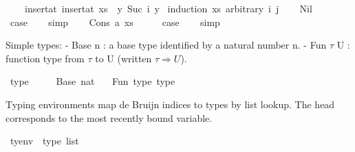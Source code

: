 \begin{isabellebody}
\ \ \ {\isacharequal}{\kern0pt}\ insert{\isacharunderscore}{\kern0pt}at\ {\isacharparenleft}{\kern0pt}insert{\isacharunderscore}{\kern0pt}at\ xs\ {}\ y{}{\isacharparenright}{\kern0pt}\ {\isacharparenleft}{\kern0pt}Suc\ i{\isacharparenright}{\kern0pt}\ y{}{\isachardoublequoteclose}\isanewline
%
\isadelimproof
%
\endisadelimproof
%
\isatagproof
{}\isamarkupfalse%
\ {\isacharparenleft}{\kern0pt}induction\ xs\ arbitrary{\isacharcolon}{\kern0pt}\ i\ j{\isacharparenright}{\kern0pt}\isanewline
\ \ \isamarkupfalse%
\ Nil\isanewline
\ \ \isamarkupfalse%
\ \isamarkupfalse%
\ {\isacharquery}{\kern0pt}case\isanewline
\ \ \isamarkupfalse%
\ simp\isanewline
{}\isamarkupfalse%
\isanewline
\ \ \isamarkupfalse%
\ {\isacharparenleft}{\kern0pt}Cons\ a\ xs{\isacharparenright}{\kern0pt}\isanewline
\ \ \isamarkupfalse%
\ \isamarkupfalse%
\ {\isacharquery}{\kern0pt}case\isanewline
\ \ \isamarkupfalse%
\ simp\isanewline
{}\isamarkupfalse%
%
\endisatagproof
{\isafoldproof}%
%
\isadelimproof
%
\endisadelimproof
%
\isadelimdocument
%
\endisadelimdocument
%
\isatagdocument
%
\isamarkuptrue%
%
\endisatagdocument
{\isafolddocument}%
%
\isadelimdocument
%
\endisadelimdocument
%
\begin{isamarkuptext}%
Simple types:
  - Base n : a base type identified by a natural number n.
  - Fun $\tau$ U : function type from $\tau$ to U (written $\tau \Rightarrow U$).%
\end{isamarkuptext}\isamarkuptrue%
\isamarkupfalse%
\ type\ {\isacharequal}{\kern0pt}\isanewline
\ \ \ \ Base\ nat\isanewline
\ \ {\isacharbar}{\kern0pt}\ Fun\ type\ type\ \ \ \ {\isacharparenleft}{\kern0pt}\ {\isacartoucheopen}{\isasymRightarrow}{\isacartoucheclose}\ {}{}{}{\isacharparenright}{\kern0pt}%
\begin{isamarkuptext}%
Typing environments map de Bruijn indices to types by list lookup.
  The head corresponds to the most recently bound variable.%
\end{isamarkuptext}\isamarkuptrue%
\isamarkupfalse%
\ tyenv\ {\isacharequal}{\kern0pt}\ {\isachardoublequoteopen}type\ list{\isachardoublequoteclose}%
\begin{isamarkuptext}%

\end{isamarkuptext}
\end{isabellebody}
